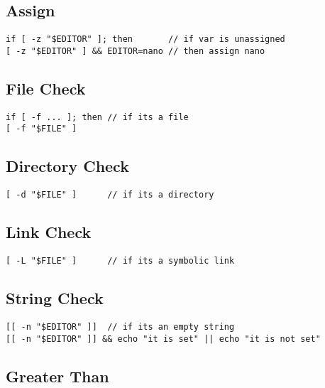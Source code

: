 \subsection{Assign}

\begin{verbatim}
if [ -z "$EDITOR" ]; then       // if var is unassigned
[ -z "$EDITOR" ] && EDITOR=nano // then assign nano
\end{verbatim}

\subsection{File Check}

\begin{verbatim}
if [ -f ... ]; then // if its a file
[ -f "$FILE" ] 
\end{verbatim}

\subsection{Directory Check}

\begin{verbatim}
[ -d "$FILE" ]      // if its a directory
\end{verbatim}

\subsection{Link Check}

\begin{verbatim}
[ -L "$FILE" ]      // if its a symbolic link 
\end{verbatim}

\subsection{String Check}

\begin{verbatim}
[[ -n "$EDITOR" ]]  // if its an empty string
[[ -n "$EDITOR" ]] && echo "it is set" || echo "it is not set"
\end{verbatim}

\subsection{Greater Than}

